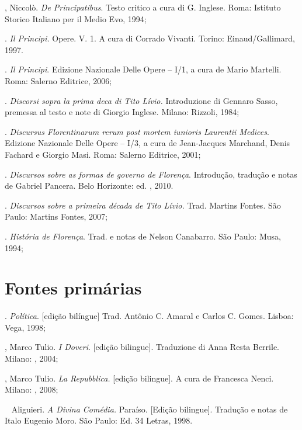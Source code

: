
\begin{bibliohedra}
, Niccolò. \emph{De Principatibus}. Testo critico a cura di
G. Inglese. Roma: Istituto Storico Italiano per il Medio Evo, 1994;

\titidem. \emph{Il Principi.} Opere. V. 1. A cura di Corrado
Vivanti. Torino: Einaud/Gallimard, 1997.

\titidem. \emph{Il Principi}. Edizione Nazionale Delle Opere
-- I/1, a cura de Mario Martelli. Roma: Salerno Editrice, 2006;

\titidem. \emph{Discorsi sopra la prima deca di Tito Lívio.}
Introduzione di Gennaro Sasso, premessa al testo e note di Giorgio
Inglese. Milano: Rizzoli, 1984;

\titidem. \emph{Discursus Florentinarum rerum post mortem
iunioris Laurentii Medices}. Edizione Nazionale Delle Opere -- I/3, a
cura de Jean-Jacques Marchand, Denis Fachard e Giorgio Masi. Roma:
Salerno Editrice, 2001;

\titidem. \emph{Discursos sobre as formas de governo de
Florença}. Introdução, tradução e notas de Gabriel Pancera. Belo
Horizonte: ed. , 2010.

\titidem. \emph{Discursos sobre a primeira década de Tito
Lívio.} Trad. Martins Fontes. São Paulo: Martins Fontes, 2007;

\titidem. \emph{História de Florença}. Trad. e notas de
Nelson Canabarro. São Paulo: Musa, 1994;

\section*{Fontes primárias}

. \emph{Política}. {[}edição bilíngue{]} Trad. Antônio C.
Amaral e Carlos C. Gomes. Lisboa: Vega, 1998;

, Marco Tulio. \emph{I Doveri}. {[}edição bilingue{]}. Traduzione
di Anna Resta Berrile. Milano: , 2004;

, Marco Tulio. \emph{La Repubblica.} {[}edição bilingue{]}. A cura
de Francesca Nenci. Milano: , 2008;

\mbox{ } Aliguieri. \emph{A Divina Comédia.} Paraíso. {[}Edição
bilingue{]}. Tradução e notas de Italo Eugenio Moro. São Paulo: Ed. 34
Letras, 1998.


\end{bibliohedra}
